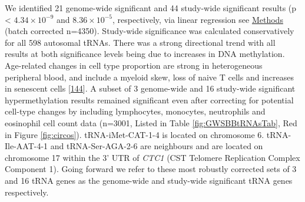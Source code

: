 \documentclass[
]{book}
\begin{document}
We identified 21 genome-wide significant and 44 study-wide significant results (p \textless{} \(4.34\times10^{-9}\) and \(8.36\times10^{-5}\), respectively, via linear regression see \protect\hyperlink{medipmodels}{Methods} (batch corrected n=4350).
Study-wide significance was calculated conservatively for all 598 autosomal tRNAs.
There was a strong directional trend with all results at both significance levels being due to increases in DNA methylation.
Age-related changes in cell type proportion are strong in heterogeneous peripheral blood, and include a myeloid skew, loss of naive T cells and increases in senescent cells {[}\protect\hyperlink{ref-Geiger2013}{144}{]}.
A subset of 3 genome-wide and 16 study-wide significant hypermethylation results remained significant even after correcting for potential cell-type changes by including lymphocytes, monocytes, neutrophils and eosinophil cell count data (n=3001, Listed in Table \ref{fig:GWSBBtRNAsTab}, Red in Figure \ref{fig:circos}).
tRNA-iMet-CAT-1-4 is located on chromosome 6.
tRNA-Ile-AAT-4-1 and tRNA-Ser-AGA-2-6 are neighbours and are located on chromosome 17 within the 3' UTR of \emph{CTC1} (CST Telomere Replication Complex Component 1).
Going forward we refer to these most robustly corrected sets of 3 and 16 tRNA genes as the genome-wide and study-wide significant tRNA genes respectively.
\end{document}
